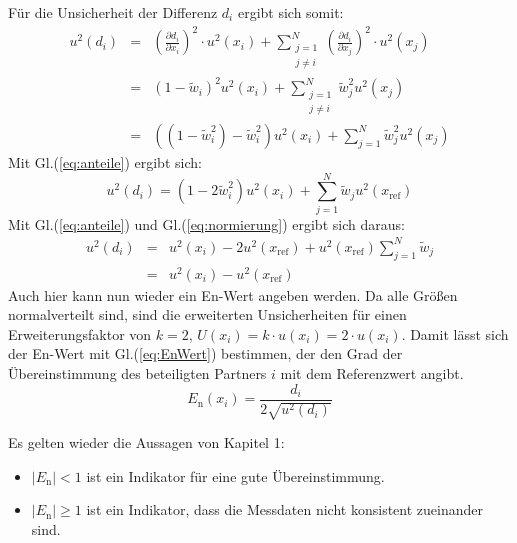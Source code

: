 \begin{itemize}
Für die Unsicherheit der Differenz $d_i$ ergibt sich somit:
\begin{eqnarray}
u^2(d_i) &=& \left( \frac{\partial d_i}{\partial x_i} \right)^2 \cdot u^2(x_i) +  \sum_{\substack{j=1 \\ j \neq i}}^{N}
\left( \frac{\partial d_i}{\partial x_j} \right)^2 \cdot u^2(x_j) \\
&=&  (1-\tilde w_i)^2 u^2(x_i) + \sum_{\substack{j=1 \\ j \neq i}}^{N} \tilde w_j^2 u^2( x_j) \\
&=& ((1-\tilde w_i^2)-\tilde w_i^2)u^2(x_i) + \sum_{j=1}^{N} \tilde w_j^2 u^2(x_j)
\end{eqnarray}
Mit Gl.(\ref{eq:anteile}) ergibt sich:
\begin{equation}
u^2(d_i) = (1-2\tilde w_i^2)u^2(x_i) + \sum_{j=1}^{N} \tilde w_j u^2(x_\mathrm{ref})
\end{equation}
Mit Gl.(\ref{eq:anteile}) und Gl.(\ref{eq:normierung}) ergibt sich daraus:
\begin{eqnarray}
u^2(d_i) &=& u^2(x_i) - 2u^2(x_\mathrm{ref}) + u^2(x_\mathrm{ref}) \sum_{j=1}^{N}\tilde w_j
\nonumber \\
  &=& u^2(x_i) -u^2(x_\mathrm{ref})
\end{eqnarray}
Auch hier kann nun wieder ein En-Wert angeben werden. Da alle Größen normalverteilt sind, sind die erweiterten Unsicherheiten für einen
Erweiterungsfaktor von $k=2$, $U(x_i) = k \cdot u(x_i) =2 \cdot u(x_i)$. Damit lässt sich der En-Wert mit Gl.(\ref{eq:EnWert}) bestimmen, der den
Grad der Übereinstimmung des beteiligten Partners $i$ mit dem Referenzwert
angibt.
\begin{equation}
E_\mathrm{n}(x_i) = \frac{d_i}{2\sqrt{u^2(d_i)}}
\end{equation}
\end{itemize}

Es gelten wieder die Aussagen von Kapitel 1:
\begin{itemize}
	\item $|E_\mathrm{n}| < 1$ ist ein Indikator für eine gute Übereinstimmung.
	\item $|E_\mathrm{n}| \ge 1 $ ist ein Indikator, dass die Messdaten nicht konsistent zueinander sind.
\end{itemize}
